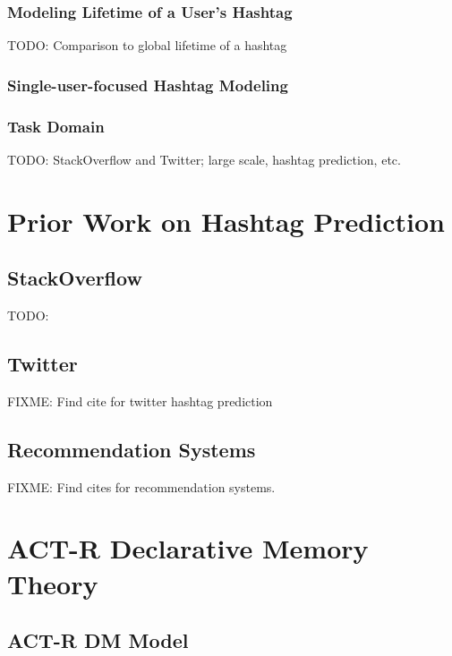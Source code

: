 \documentclass[man]{apa6}
\begin{document}
\subsubsection{Modeling Lifetime of a User's Hashtag}

TODO: Comparison to global lifetime of a hashtag \cite{Tsur2012}

\subsubsection{Single-user-focused Hashtag Modeling}

\subsubsection{Task Domain}

TODO: StackOverflow and Twitter; large scale, hashtag prediction, etc. 

\section{Prior Work on Hashtag Prediction}

\subsection{StackOverflow}

TODO: \cite{Kuo2011}

\subsection{Twitter}

FIXME: Find cite for twitter hashtag prediction

\subsection{Recommendation Systems}

FIXME: Find cites for recommendation systems.

\section{ACT-R Declarative Memory Theory}

\cite{Anderson2004}

\subsection{ACT-R DM Model}
\end{document}
